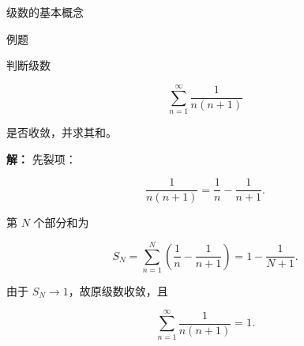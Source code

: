 \documentclass[aspectratio=169,10pt,fontset=fandol]{ctexbeamer}
\begin{document}
\begin{frame}[t,fragile]{级数的基本概念}
\normalsize
\begin{block}{例题}
{\normalsize
判断级数

\[

\sum_{n=1}^{\infty}\frac{1}{n(n+1)}

\]

是否收敛，并求其和。


}
\end{block}
\pause
{\normalsize
\textbf{解：}
先裂项：

\[

\frac{1}{n(n+1)}=\frac1n-\frac{1}{n+1}.

\]

第 $N$ 个部分和为

\[

S_N=\sum_{n=1}^{N}\left(\frac1n-\frac{1}{n+1}\right)

=1-\frac{1}{N+1}.

\]

由于 $S_N\to1$，故原级数收敛，且

\[

\sum_{n=1}^{\infty}\frac{1}{n(n+1)}=1.

\]


}
\end{frame}
\end{document}
